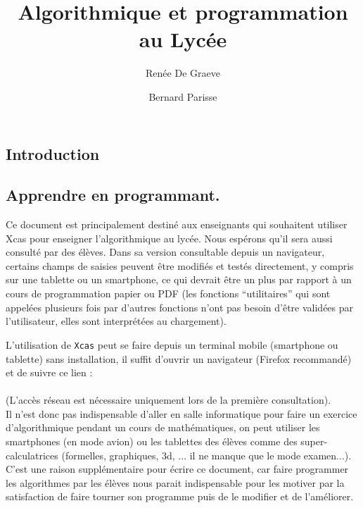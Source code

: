 \documentclass[12pt,a4paper]{book}
\author{Ren\'ee De Graeve \and Bernard Parisse}
\title{Algorithmique et programmation au Lyc\'ee}
\begin{document}
\begin{giacjshere}
\maketitle
\newpage
\tableofcontents
\newpage
\printindex 


\chapter{Introduction}
\section{Apprendre en programmant.}
Ce document est principalement destin\'e aux enseignants qui 
souhaitent utiliser Xcas pour enseigner l'algorithmique au lyc\'ee.
Nous esp\'erons qu'il sera aussi consult\'e par des \'el\`eves.
Dans sa version 
 consultable depuis un navigateur, certains champs de saisies peuvent 
\^etre modifi\'es et test\'es directement, y compris sur une tablette
ou un smartphone, ce qui devrait \^etre un plus par rapport
\`a un cours de programmation papier ou PDF (les fonctions ``utilitaires'' qui 
sont appel\'ees plusieurs fois par d'autres fonctions n'ont pas besoin 
d'\^etre valid\'ees par l'utilisateur, elles sont interpr\'et\'ees 
au chargement).

L'utilisation de {\tt Xcas} peut se faire depuis un terminal mobile (smartphone 
ou tablette) sans installation, il suffit d'ouvrir un navigateur (Firefox 
recommand\'e) et de suivre ce lien :\\
\\
(L'acc\`es r\'eseau est n\'ecessaire uniquement lors de la premi\`ere
consultation).\\
Il n'est donc pas indispensable d'aller en salle informatique
pour faire un exercice d'algorithmique pendant un cours de math\'ematiques, 
on peut utiliser les smartphones (en mode avion) 
ou les tablettes des \'el\`eves comme des super-calculatrices (formelles, 
graphiques, 3d, ... il ne manque que le mode examen...). C'est une
raison suppl\'ementaire pour \'ecrire ce document, car faire programmer 
les algorithmes par les \'el\`eves nous parait indispensable
pour les motiver par la satisfaction de faire tourner son
programme puis de le modifier et de l'am\'eliorer. 


\end{giacjshere}
\end{document}
